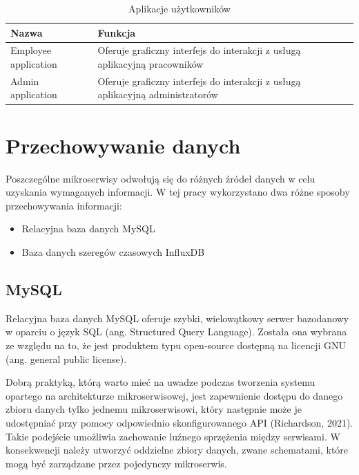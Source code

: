\documentclass[11pt, a4]{article} %
\begin{document}
\begin{table}[!ht]
    \caption{Aplikacje użytkowników}
    \label{tab:aplikacje-uzytkownikow}
    \begin{tabularx}{1\textwidth} { 
        | >{\raggedright\arraybackslash}X        
        | >{\raggedleft\arraybackslash}X | }
        \hline
       Nazwa & Funkcja \\
       \hline
       Employee application & 
       Oferuje graficzny interfejs do interakcji z usługą aplikacyjną pracowników \\
       \hline
       Admin application &
       Oferuje graficzny interfejs do interakcji z usługą aplikacyjną administratorów \\
       \hline
    \end{tabularx}
\end{table}

\section{Przechowywanie danych}

Poszczególne mikroserwisy odwołują się do różnych źródeł danych w celu uzyskania 
wymaganych informacji. W tej pracy wykorzystano dwa różne sposoby przechowywania 
informacji:

\begin{itemize} %
    \item Relacyjna baza danych MySQL
    \item Baza danych szeregów czasowych InfluxDB
\end{itemize}

\subsection{MySQL}

Relacyjna baza danych MySQL oferuje szybki, wielowątkowy serwer bazodanowy w oparciu 
o język SQL (ang. Structured Query Language). Została ona wybrana ze względu na to, że 
jest produktem typu open-source dostępną na licencji GNU (ang. general public license). 

Dobrą praktyką, którą warto mieć na uwadze podczas tworzenia systemu opartego na 
architekturze mikroserwisowej, jest zapewnienie dostępu do danego zbioru danych tylko 
jednemu mikroserwisowi, który następnie może je udostępniać przy pomocy odpowiednio 
skonfigurowanego API (Richardson, 2021). Takie podejście umożliwia zachowanie luźnego 
sprzężenia między serwisami. W konsekwencji należy utworzyć oddzielne zbiory 
danych, zwane schematami, które mogą być zarządzane przez pojedynczy mikroserwis.
\end{document}
